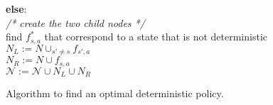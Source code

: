 \begin{figure}[h!]
{{\hspace*{3ex} \hspace*{3ex} \hspace*{3ex} {\bf else}:\\
\hspace*{3ex} \hspace*{3ex} \hspace*{3ex} \hspace*{3ex} {\em {\footnotesize /* create the two child nodes */}}\\
\hspace*{3ex} \hspace*{3ex} \hspace*{3ex} \hspace*{3ex} find $f^*_{s,a}$ that correspond to a state that is not deterministic  \\
\hspace*{3ex} \hspace*{3ex} \hspace*{3ex} \hspace*{3ex} $N_L := N \cup_{s' \neq s} f_{s',a}$  \\
\hspace*{3ex} \hspace*{3ex} \hspace*{3ex} \hspace*{3ex} $N_R := N \cup f_{s,a}$  \\
\hspace*{3ex} \hspace*{3ex} \hspace*{3ex} \hspace*{3ex} $\mathcal{N} := \mathcal{N} \cup N_L \cup N_R$\\
}}
\caption{Algorithm to find an optimal deterministic policy.} \label{fig:basic_bb}
\end{figure}
